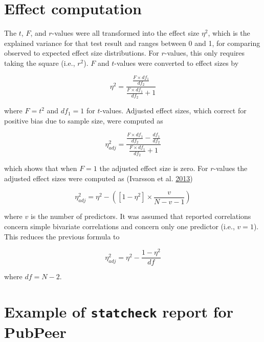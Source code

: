 \documentclass[a5paper]{book}
\begin{document}
\chapter{Effect computation}\label{effect-computation}

The \(t\), \(F\), and \(r\)-values were all transformed into the effect
size \(\eta^2\), which is the explained variance for that test result
and ranges between 0 and 1, for comparing observed to expected effect
size distributions. For \(r\)-values, this only requires taking the
square (i.e., \(r^2\)). \(F\) and \(t\)-values were converted to effect
sizes by

\begin{equation}
\eta^2=\frac{\frac{F\times df_1}{df_2}}{\frac{F\times df_1}{df_2}+1}
\label{eq:b1}
\end{equation}

where \(F=t^2\) and \(df_1=1\) for \(t\)-values. Adjusted effect sizes,
which correct for positive bias due to sample size, were computed as

\begin{equation}
\eta^2_{adj}=\frac{\frac{F\times df_1}{df_2}-\frac{df_1}{df_2}}{\frac{F\times df_1}{df_2}+1}
\label{eq:b2}
\end{equation}

which shows that when \(F=1\) the adjusted effect size is zero. For
\(r\)-values the adjusted effect sizes were computed as (Ivarsson et al.
\protect\hyperlink{ref-doi:10.1016ux2fj.psychsport.2012.07.007}{2013})

\begin{equation}
\eta^2_{adj}=\eta^2-([1-\eta^2]\times\frac{v}{N-v-1})
\label{eq:b3}
\end{equation}

where \(v\) is the number of predictors. It was assumed that reported
correlations concern simple bivariate correlations and concern only one
predictor (i.e., \(v=1\)). This reduces the previous formula to

\begin{equation}
\eta^2_{adj}=\eta^2-\frac{1-\eta^2}{df}
\label{eq:b4}
\end{equation}

where \(df=N-2\).

\chapter{\texorpdfstring{Example of \texttt{statcheck} report for
PubPeer}{Example of statcheck report for PubPeer}}\label{example-of-statcheck-report-for-pubpeer}
\end{document}

